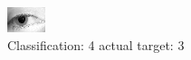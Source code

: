 \begin{figure}[h!]
\begin{center}
\includegraphics[width=0.60\columnwidth]{figures/ID1297_class_4_target_3.png}
\end{center}
\caption{ Classification: 4 actual target: 3}
\label{fig:ID1297_class_4_target_3}
\end{figure}
